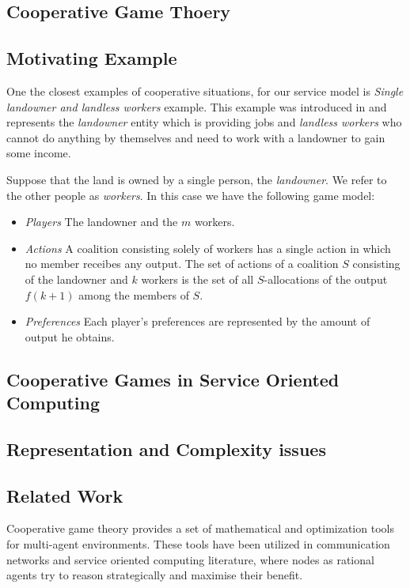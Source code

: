         \subsection{Cooperative Game Thoery}\label{sec:BRWS}

        \subsection{Motivating Example}\label{sec:CWSDefinition}
        
        One the closest examples of cooperative situations, for our service model is \emph{Single landowner and landless workers} example. 
        This example was introduced in \cite{GVK369342747} and represents the \emph{landowner} entity which is providing jobs and \emph{landless workers} who cannot do anything by themselves and need to work with a landowner to gain some income.
        
        Suppose that the land is owned by a single person, the \emph{landowner}. We refer to the other people as \emph{workers}. In this case we have the following game model:
        
        \begin{itemize}
        \item \emph{Players} The landowner and the $m$ workers.
        \item \emph{Actions} A coalition consisting solely of workers has a single action in which no member receibes any output. The set of actions of a coalition $S$ consisting of the landowner and $k$ workers is the set of all $S$-allocations of the output $f(k+1)$ among the members of $S$.
        \item \emph{Preferences} Each player's preferences are represented by the amount of output he obtains.
        \end{itemize}

        \subsection{Cooperative Games in Service Oriented Computing}\label{sec:CWSArchitecture}

        \subsection{Representation and Complexity issues}\label{sec:CWSArchitecture}
        
        \subsection{Related Work}\label{sec:CGTMSRelatedWork}

Cooperative game theory provides a set of mathematical and optimization tools for multi-agent environments. These tools have been utilized in communication networks and service oriented computing literature, where nodes as rational agents try to reason strategically and maximise their benefit.





